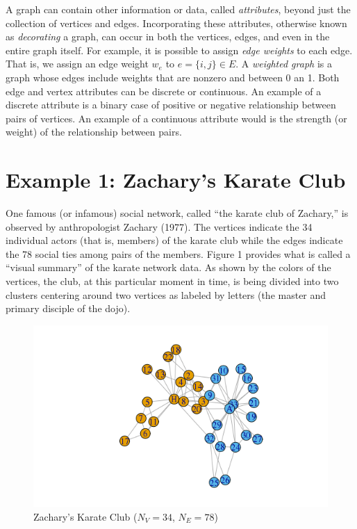 \documentclass[12pt,twoside]{amherstthesis}
\begin{document}
  A graph can contain other information or data, called \emph{attributes},
  beyond just the collection of vertices and edges. Incorporating these
  attributes, otherwise known as \emph{decorating} a graph, can occur in
  both the vertices, edges, and even in the entire graph itself. For
  example, it is possible to assign \emph{edge weights} to each edge. That
  is, we assign an edge weight \(w_e\) to \(e = \{i, j\} \in E\). A
  \emph{weighted graph} is a graph whose edges include weights that are
  nonzero and between 0 an 1. Both edge and vertex attributes can be
  discrete or continuous. An example of a discrete attribute is a binary
  case of positive or negative relationship between pairs of vertices. An
  example of a continuous attribute would is the strength (or weight) of
  the relationship between pairs.
  
  \section{Example 1: Zachary's Karate
  Club}\label{example-1-zacharys-karate-club}
  
  One famous (or infamous) social network, called ``the karate club of
  Zachary,'' is observed by anthropologist Zachary (1977). The vertices
  indicate the 34 individual actors (that is, members) of the karate club
  while the edges indicate the 78 social ties among pairs of the members.
  Figure 1 provides what is called a ``visual summary'' of the karate
  network data. As shown by the colors of the vertices, the club, at this
  particular moment in time, is being divided into two clusters centering
  around two vertices as labeled by letters (the master and primary
  disciple of the dojo).
  
  \begin{figure}[htbp]
  \centering
  \includegraphics{figure/01karateplot.png}
  \caption{Zachary's Karate Club (\(N_V = 34\), \(N_E = 78\))}
  \end{figure}
  
\end{document}
